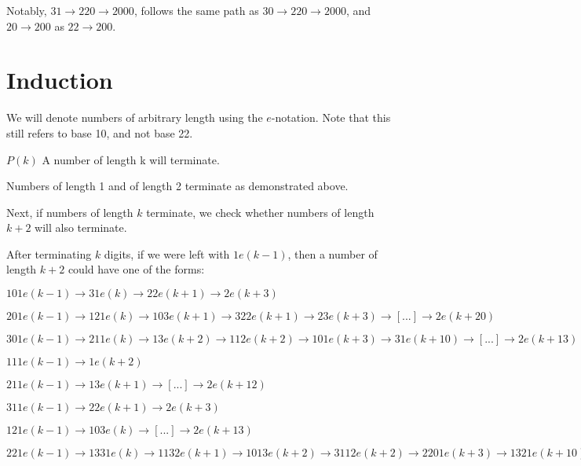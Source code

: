 \documentclass{proc-l}
\theoremstyle{definition}
\theoremstyle{remark}
\numberwithin{equation}{section}
\begin{document}
Notably, $31 \rightarrow 220 \rightarrow 2000$, follows the same path as $30 \rightarrow 220 \rightarrow 2000$, and $20 \rightarrow 200$ as $22 \rightarrow 200$.

\addtocounter{section}{6}


\section{Induction}

We will denote numbers of arbitrary length using the $e$-notation. Note that this still refers to base 10, and not base 22.

$P(k)$ A number of length k will terminate.

Numbers of length 1 and of length 2 terminate as demonstrated above.

Next, if numbers of length $k$ terminate, we check whether numbers of length $k+2$ will also terminate.

After terminating $k$ digits, if we were left with $1e(k-1)$, then a number of length $k+2$ could have one of the forms:

$101e(k-1) \rightarrow 31e(k) \rightarrow 22e(k+1) \rightarrow 2e(k+3)$

$201e(k-1) \rightarrow 121e(k) \rightarrow 103e(k+1) \rightarrow 322e(k+1) \rightarrow 23e(k+3) \rightarrow [...] \rightarrow 2e(k+20)$

$301e(k-1) \rightarrow 211e(k) \rightarrow 13e(k+2) \rightarrow 112e(k+2) \rightarrow 101e(k+3) \rightarrow 31e(k+10) \rightarrow [...] \rightarrow 2e(k+13)$

$111e(k-1) \rightarrow 1e(k+2)$

$211e(k-1) \rightarrow 13e(k+1) \rightarrow [...] \rightarrow 2e(k+12)$

$311e(k-1) \rightarrow 22e(k+1) \rightarrow 2e(k+3)$

$121e(k-1) \rightarrow 103e(k) \rightarrow [...] \rightarrow 2e(k+13)$

$221e(k-1) \rightarrow 1331e(k) \rightarrow 1132e(k+1) \rightarrow 1013e(k+2) \rightarrow 3112e(k+2) \rightarrow 2201e(k+3) \rightarrow 1321e(k+10) \rightarrow 1123e(k+11) \rightarrow 10102e(k+11) \rightarrow 3032e(k+12) \rightarrow 2123e(k+13) \rightarrow 13102e(k+13) \rightarrow 11132e(k+20) \rightarrow 10013e(k+21) \rightarrow 30112e(k+21) \rightarrow 21101e(k+22) \rightarrow 12331e(k+23) \rightarrow 11032e(k+30) \rightarrow 3323e(k+31) \rightarrow 23302e(k+31) \rightarrow 20312e(k+32) \rightarrow 12221e(k+33) \rightarrow 10333e(k+100) \rightarrow 32332e(k+100) \rightarrow 23033e(k+101) \rightarrow 201232e(k+101) \rightarrow 121102e(k+102) \rightarrow 102332e(k+103) \rightarrow 32032e(k+110) \rightarrow 22222e(k+111) \rightarrow 2e(k+122)$
\end{document}
